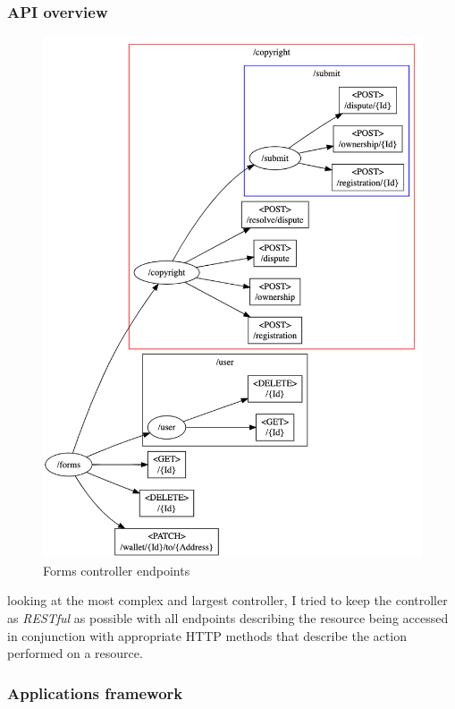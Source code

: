 \documentclass[12pt]{article}
\begin{document}
\subsubsection{API overview}
\begin{figure}[H]
\caption{Forms controller endpoints}
\centering
\includegraphics[width=\textwidth,height=0.5\textheight,keepaspectratio]{images/operational/Forms-Api}
\end{figure}

looking at the most complex and largest controller, I tried to keep the controller as \textit{RESTful} as possible with all endpoints describing the resource being accessed in conjunction with appropriate HTTP methods that describe the action performed on a resource.

\subsubsection{Applications framework}
\end{document}
